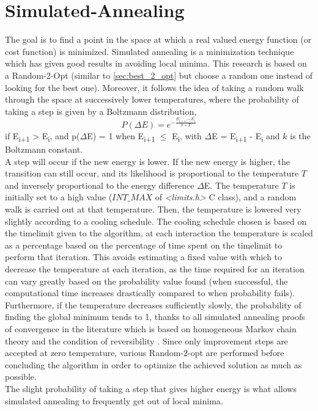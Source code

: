 \section{Simulated-Annealing}
The goal is to find a point in the space at which a real valued energy function (or cost function) is minimized. Simulated annealing is a minimization technique which has given good results in avoiding local minima. This research is based on a Random-2-Opt (similar to \ref{sec:best_2_opt} but choose a random one instead of looking for the best one). Moreover, it follows the idea of taking a random walk through the space at successively lower temperatures, where the probability of taking a step is given by a Boltzmann distribution,
\begin{equation}
	P(\Delta E)=e^{-\frac{ E_{i+1} - E_{i}}{k \times T}}
\end{equation}
if  E\textsubscript{i+1} > E\textsubscript{i}, and p($\Delta$E) = 1 when  E\textsubscript{i+1} $\leq$ E\textsubscript{i}, with $\Delta$E =  E\textsubscript{i+1} - E\textsubscript{i} and $k$ is the Boltzmann constant. \\
A step will occur if the new energy is lower. If the new energy is higher, the transition can still occur, and its likelihood is proportional to the temperature $T$ and inversely proportional to the energy difference $\Delta$E.
The temperature $T$ is initially set to a high value (\textit{$INT\_MAX$} of \textit{<limits.h>} C class), and a random walk is carried out at that temperature. Then, the temperature is lowered very slightly according to a cooling schedule.
The cooling schedule chosen is based on the timelimit given to the algorithm, at each interaction the temperature is scaled as a percentage based on the percentage of time spent on the timelimit to perform that iteration. This avoids estimating a fixed value with which to decrease the temperature at each iteration, as the time required for an iteration can vary greatly based on the probability value found (when successful, the computational time increases drastically compared to when probability fails).\\
Furthermore, if the temperature decreases sufficiently slowly, the probability of finding the global minimum tends to 1, thanks to all simulated annealing proofs of convergence in the literature which is based on homogeneous Markov chain theory and the condition of reversibility \cite{Henderson}. Since only improvement steps are accepted at zero temperature, various Random-2-opt are performed before concluding the algorithm in order to optimize the achieved solution as much as possible.\\
The slight probability of taking a step that gives higher energy is what allows simulated annealing to frequently get out of local minima.

